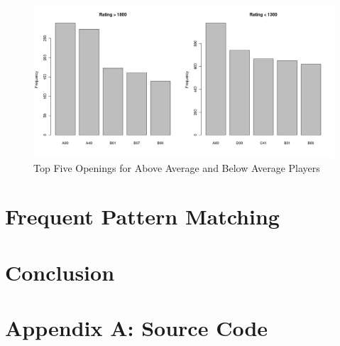 \documentclass{article}
\begin{document}
\begin{figure} [htp]
\begin{center}
\includegraphics[width=5in]{eco_bar_comp.png}
\end{center}
\caption{Top Five Openings for Above Average and Below Average Players}
\label{fig:ecobarcomp}
\end{figure}


\section{Frequent Pattern Matching}
\section{Conclusion}
\section{Appendix A: Source Code}



\pagebreak


\end{document}
